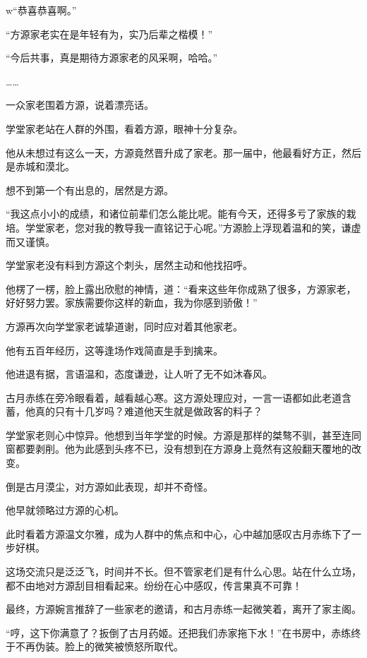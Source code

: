 
\begin{this_body}

w“恭喜恭喜啊。”

“方源家老实在是年轻有为，实乃后辈之楷模！”

“今后共事，真是期待方源家老的风采啊，哈哈。”

……

一众家老围着方源，说着漂亮话。

学堂家老站在人群的外围，看着方源，眼神十分复杂。

他从未想过有这么一天，方源竟然晋升成了家老。那一届中，他最看好方正，然后是赤城和漠北。

想不到第一个有出息的，居然是方源。

“我这点小小的成绩，和诸位前辈们怎么能比呢。能有今天，还得多亏了家族的栽培。学堂家老，您对我的教导我一直铭记于心呢。”方源脸上浮现着温和的笑，谦虚而又谨慎。

学堂家老没有料到方源这个刺头，居然主动和他找招呼。

他楞了一楞，脸上露出欣慰的神情，道：“看来这些年你成熟了很多，方源家老，好好努力罢。家族需要你这样的新血，我为你感到骄傲！”

方源再次向学堂家老诚挚道谢，同时应对着其他家老。

他有五百年经历，这等逢场作戏简直是手到擒来。

他进退有据，言语温和，态度谦逊，让人听了无不如沐春风。

古月赤练在旁冷眼看着，越看越心寒。这方源处理应对，一言一语都如此老道含蓄，他真的只有十几岁吗？难道他天生就是做政客的料子？

学堂家老则心中惊异。他想到当年学堂的时候。方源是那样的桀骜不驯，甚至连同窗都要剥削。他为此感到头疼不已，没有想到在方源身上竟然有这般翻天覆地的改变。

倒是古月漠尘，对方源如此表现，却并不奇怪。

他早就领略过方源的心机。

此时看着方源温文尔雅，成为人群中的焦点和中心，心中越加感叹古月赤练下了一步好棋。

这场交流只是泛泛飞，时间并不长。但不管家老们是有什么心思。站在什么立场，都不由地对方源刮目相看起来。纷纷在心中感叹，传言果真不可靠！

最终，方源婉言推辞了一些家老的邀请，和古月赤练一起微笑着，离开了家主阁。

“哼，这下你满意了？扳倒了古月药姬。还把我们赤家拖下水！”在书房中，赤练终于不再伪装。脸上的微笑被愤怒所取代。


\end{this_body}
